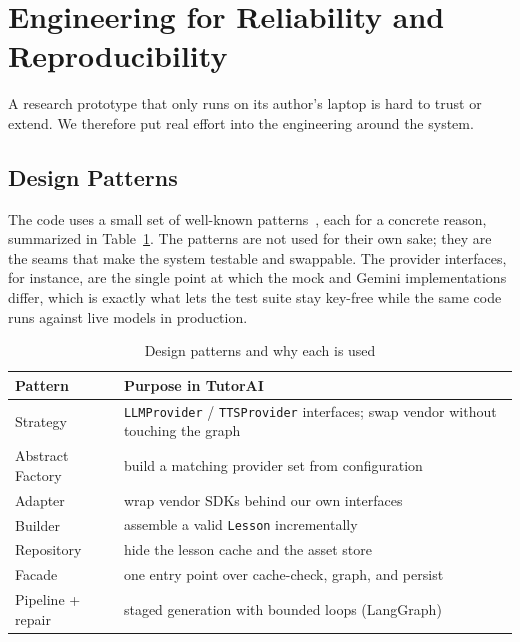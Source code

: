 \documentclass[conference]{IEEEtran}
\begin{document}
\section{Engineering for Reliability and Reproducibility}
\label{sec:engineering}

A research prototype that only runs on its author's laptop is hard to trust or
extend. We therefore put real effort into the engineering around the system.

\subsection{Design Patterns}
The code uses a small set of well-known patterns~\cite{gamma1994}, each for a
concrete reason, summarized in Table~\ref{tab:patterns}. The patterns are not
used for their own sake; they are the seams that make the system testable and
swappable. The provider interfaces, for instance, are the single point at which
the mock and Gemini implementations differ, which is exactly what lets the test
suite stay key-free while the same code runs against live models in production.

\begin{table}[t]
\caption{Design patterns and why each is used}
\label{tab:patterns}
\centering
\renewcommand{\arraystretch}{1.25}
\begin{tabular}{@{}p{1.7cm}p{5.5cm}@{}}
\toprule
\textbf{Pattern} & \textbf{Purpose in TutorAI} \\
\midrule
Strategy & \texttt{LLMProvider} / \texttt{TTSProvider} interfaces; swap vendor without touching the graph \\
Abstract Factory & build a matching provider set from configuration \\
Adapter & wrap vendor SDKs behind our own interfaces \\
Builder & assemble a valid \texttt{Lesson} incrementally \\
Repository & hide the lesson cache and the asset store \\
Facade & one entry point over cache-check, graph, and persist \\
Pipeline + repair & staged generation with bounded loops (LangGraph) \\
\bottomrule
\end{tabular}
\end{table}
\end{document}
